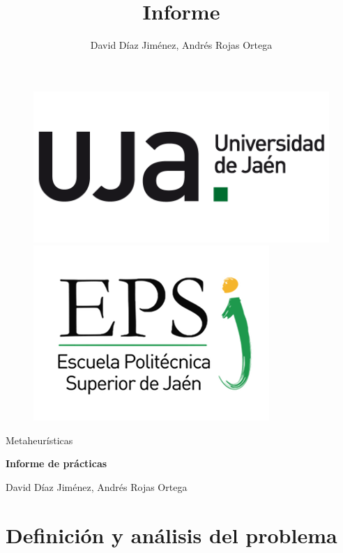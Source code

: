 \documentclass{article}
\title{Informe}
\author{David Díaz Jiménez, Andrés Rojas Ortega}
\begin{document}
	
	\begin{figure}[t]
		\centering
		\includegraphics[scale=0.2]{img/np_UJA_generica_6.png}
		\includegraphics[scale=0.35]{img/Logo_EPS.png}
		
	\end{figure}
	
	\begin{center}
		
		\begin{large}
			
			Metaheurísticas
			
		\end{large}
		
		\vspace*{0.2in}
		\textbf{\large Informe de prácticas}
		
		\vspace*{.2in}
		
		David Díaz Jiménez, Andrés Rojas Ortega
		
		\vspace*{2.5cm}
		
	\end{center}
	
	\section{Definición y análisis del problema}
	
\end{document}
